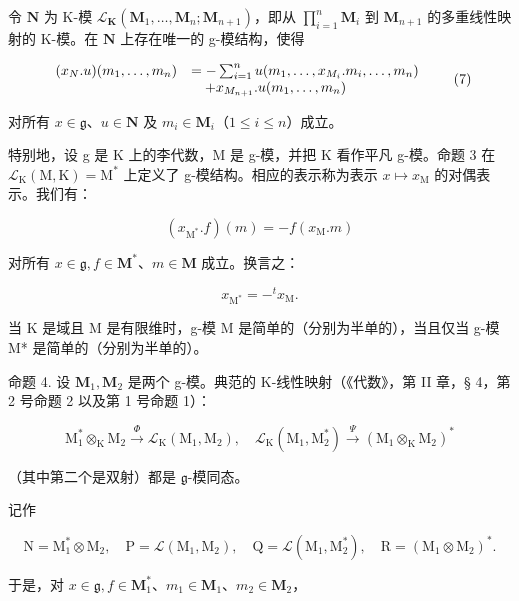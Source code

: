 令 \(\mathbf{N}\) 为 K-模 \(\mathcal{L}_{\mathbf{K}}(\mathbf{M}_1, \ldots, \mathbf{M}_n; \mathbf{M}_{n+1})\)，即从 \(\prod_{i=1}^{n} \mathbf{M}_i\) 到 \(\mathbf{M}_{n+1}\) 的多重线性映射的 K-模。在 \(\mathbf{N}\) 上存在唯一的 g-模结构，使得

\[
\begin{array}{r l} (x _ {N}. u) (m _ {1}, \ldots , m _ {n}) & = - \sum_ {i = 1} ^ {n} u (m _ {1}, \ldots , x _ {M _ {i}}. m _ {i}, \ldots , m _ {n}) \\ & \quad + x _ {M _ {n + 1}}. u (m _ {1}, \ldots , m _ {n}) \end{array}\tag{7}
\]

对所有 \(x \in \mathfrak{g}\)、\(u \in \mathbf{N}\) 及 \(m_i \in \mathbf{M}_i\)（\(1 \leqslant i \leqslant n\)）成立。

特别地，设 g 是 K 上的李代数，M 是 g-模，并把 K 看作平凡 g-模。命题 3 在 \(\mathcal{L}_{\mathrm{K}}(\mathrm{M},\mathrm{K}) = \mathrm{M}^{*}\) 上定义了 g-模结构。相应的表示称为表示 \(x\mapsto x_{\mathrm{M}}\) 的对偶表示。我们有：

\[
(x _ {\mathrm{M} ^ {*}}. f) (m) = - f (x _ {\mathrm{M}}. m)\tag{8}
\]

对所有 \(x \in \mathfrak{g}, f \in \mathbf{M}^*\)、\(m \in \mathbf{M}\) 成立。换言之：

\[
x _ {\mathrm{M} ^ {*}} = - ^ {t} x _ {\mathrm{M}}.\tag{9}
\]

当 K 是域且 M 是有限维时，g-模 M 是简单的（分别为半单的），当且仅当 g-模 M* 是简单的（分别为半单的）。

命题 4. 设 \(\mathbf{M}_1, \mathbf{M}_2\) 是两个 g-模。典范的 K-线性映射（《代数》，第 II 章，§ 4，第 2 号命题 2 以及第 1 号命题 1）：

\[
\mathrm{M} _ {1} ^ {*} \otimes_ {\mathrm{K}} \mathrm{M} _ {2} \xrightarrow {\Phi} \mathscr {L} _ {\mathrm{K}} (\mathrm{M} _ {1}, \mathrm{M} _ {2}), \quad \mathscr {L} _ {\mathrm{K}} (\mathrm{M} _ {1}, \mathrm{M} _ {2} ^ {*}) \xrightarrow {\Psi} (\mathrm{M} _ {1} \otimes_ {\mathrm{K}} \mathrm{M} _ {2}) ^ {*}
\]

（其中第二个是双射）都是 \(\mathfrak{g}\)-模同态。

  记作

\[
\mathrm{N} = \mathrm{M} _ {1} ^ {*} \otimes \mathrm{M} _ {2}, \quad \mathrm{P} = \mathscr {L} (\mathrm{M} _ {1}, \mathrm{M} _ {2}), \quad \mathrm{Q} = \mathscr {L} (\mathrm{M} _ {1}, \mathrm{M} _ {2} ^ {*}), \quad \mathrm{R} = (\mathrm{M} _ {1} \otimes \mathrm{M} _ {2}) ^ {*}.
\]

于是，对 \(x \in \mathfrak{g}, f \in \mathbf{M}_1^*\)、\(m_1 \in \mathbf{M}_1\)、\(m_2 \in \mathbf{M}_2\)，

